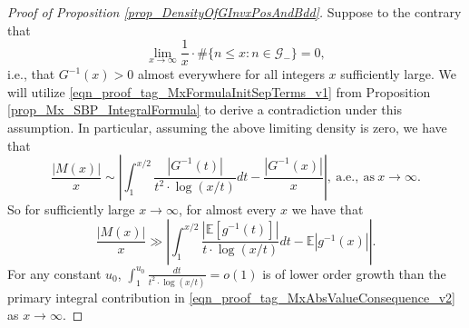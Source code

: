 \documentclass[11pt,reqno,a4letter]{article}
\numberwithin{figure}{section}
\numberwithin{table}{section}
\theoremstyle{plain}
\numberwithin{theorem}{section}
\theoremstyle{definition}
\begin{document}
\begin{proof}[Proof of Proposition \ref{prop_DensityOfGInvxPosAndBdd}] 
Suppose to the contrary that 
\[
\lim_{x \rightarrow \infty} \frac{1}{x} \cdot \#\{n \leq x: n \in \mathcal{G}_{-}\} = 0, 
\]
i.e., that $G^{-1}(x) > 0$ almost everywhere for all integers $x$ sufficiently large. 
We will utilize \eqref{eqn_proof_tag_MxFormulaInitSepTerms_v1} 
from Proposition \ref{prop_Mx_SBP_IntegralFormula} to 
derive a contradiction under this assumption. 
In particular, assuming the above limiting density is zero, we have that 
\begin{equation} 
\label{eqn_proof_tag_MxAbsValueConsequence_v1} 
\frac{|M(x)|}{x} \sim \left\lvert \int_1^{x/2} \frac{|G^{-1}(t)|}{t^2 \cdot \log(x/t)} dt - 
     \frac{|G^{-1}(x)|}{x} \right\rvert, \mathrm{\ a.e. }, \mathrm{\ as\ } x \rightarrow \infty. 
\end{equation} 
So for sufficiently large $x \rightarrow \infty$, for almost every $x$ we have that 
\begin{equation} 
\label{eqn_proof_tag_MxAbsValueConsequence_v2} 
\frac{|M(x)|}{x} \gg \left\lvert \int_1^{x/2} \frac{|\mathbb{E}[g^{-1}(t)]|}{t \cdot \log(x/t)} dt - 
     \mathbb{E}|g^{-1}(x)| \right\rvert. 
\end{equation} 
For any constant $u_0$, 
$\int_{1}^{u_0} \frac{dt}{t^2 \cdot \log(x/t)} = o(1)$ is of lower order 
growth than the primary integral contribution in 
\eqref{eqn_proof_tag_MxAbsValueConsequence_v2} as $x \rightarrow \infty$. 


\end{proof}
\end{document}
